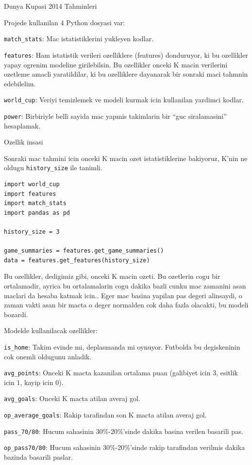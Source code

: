 \documentclass[12pt,fleqn]{article}\usepackage{../common}
\begin{document}
Dunya Kupasi 2014 Tahminleri

Projede kullanilan 4 Python dosyasi var: 

\verb!match_stats!: Mac istatistiklerini yukleyen kodlar.

\verb!features!: Ham istatistik verileri ozelliklere (features) donduruyor,
ki bu ozellikler yapay ogrenim modeline girilebilsin. Bu ozellikler onceki
K macin verilerini ozetleme amacli yaratildilar, ki bu ozelliklere
dayanarak bir sonraki maci tahmnin edebilelim.

\verb!world_cup!: Veriyi temizlemek ve modeli kurmak icin kullanilan
yardimci kodlar.

\verb!power!: Birbiriyle belli sayida mac yapmis takimlarin bir ``guc
siralamasini'' hesaplamak. 

Ozellik insasi

Sonraki mac tahmini icin onceki K macin ozet istatistiklerine bakiyoruz, K'nin
ne oldugu \verb!history_size! ile tanimli.

\begin{verbatim}
import world_cup
import features
import match_stats
import pandas as pd

history_size = 3

game_summaries = features.get_game_summaries()
data = features.get_features(history_size)
\end{verbatim}

Bu ozellikler, dedigimiz gibi, onceki K macin ozeti. Bu ozetlerin cogu bir
ortalamadir, ayrica bu ortalamalarin cogu dakika bazli cunku mac zamanini
asan maclari da hesaba katmak icin.. Eger mac basina yapilan pas degeri
alinsaydi, o zaman vakti asan bir macta o deger normalden cok daha fazla
olacakti, bu modeli bozardi.

Modelde kullanilacak ozellikler:

\verb!is_home!: Takim evinde mi, deplasmanda mi oynuyor. Futbolda bu
degiskeninin cok onemli oldugunu anladik.

\verb!avg_points!: Onceki K macta kazanilan ortalama puan (galibiyet icin
3, esitlik icin 1, kayip icin 0). 

\verb!avg_goals!: Onceki K macta atilan averaj gol.

\verb!op_average_goals!: Rakip tarafindan son K macta atilan averaj gol.

\verb!pass_70/80!: Hucum sahasinin 30\%-20\%'sinde dakika basina verilen
basarili pas.

\verb!op_pass70/80!: Hucum sahasinin 30\%-20\%'sinde rakip tarafindan
verilmis dakika bazinda basarili paslar.
\end{document}
